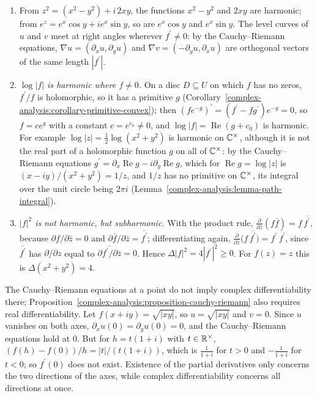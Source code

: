 \begin{example}\label{complex-analysis:example-harmonic}
\begin{enumerate}
\item From $z^2 = (x^2 - y^2) + i\,2xy$, the functions $x^2 - y^2$ and $2xy$ are harmonic; from $e^z = e^x\cos y + ie^x\sin y$, so are $e^x\cos y$ and $e^x\sin y$. The level curves of $u$ and
$v$ meet at right angles wherever $f^{\prime} \neq 0$: by the Cauchy--Riemann equations, $\nabla u = (\partial_xu, \partial_yu)$ and $\nabla v = (-\partial_yu, \partial_xu)$ are orthogonal vectors of
the same length $|f^{\prime}|$.
\item \emph{$\log|f|$ is harmonic where $f \neq 0$.} On a disc $D \subseteq U$ on which $f$ has no zeros, $f^{\prime}/f$ is holomorphic, so it has a primitive $g$
(Corollary~\ref{complex-analysis:corollary-primitive-convex}); then $(fe^{-g})^{\prime} = (f^{\prime} - fg^{\prime})e^{-g} = 0$, so $f = ce^g$ with a constant $c = e^{c_0} \neq 0$, and
$\log|f| = \operatorname{Re}(g + c_0)$ is harmonic. For example $\log|z| = \frac12\log(x^2 + y^2)$ is harmonic on $\mathbb{C}^\times$, although it is not the real part of a holomorphic function $g$ on all of
$\mathbb{C}^\times$: by the Cauchy--Riemann equations $g^{\prime} = \partial_x\operatorname{Re}g - i\partial_y\operatorname{Re}g$, which for $\operatorname{Re}g = \log|z|$ is $(x - iy)/(x^2 + y^2) = 1/z$, and
$1/z$ has no primitive on $\mathbb{C}^\times$, its integral over the unit circle being $2\pi i$ (Lemma~\ref{complex-analysis:lemma-path-integral}).
\item \emph{$|f|^2$ is not harmonic, but subharmonic.} With the product rule, $\frac{\partial}{\partial\bar z}(f\bar f) = f\,\overline{f^{\prime}}$, because $\partial f/\partial\bar z = 0$ and
$\partial\bar f/\partial\bar z = \overline{f^{\prime}}$; differentiating again, $\frac{\partial}{\partial z}\bigl(f\,\overline{f^{\prime}}\bigr) = f^{\prime}\,\overline{f^{\prime}}$, since $\overline{f^{\prime}}$
has $\partial/\partial z$ equal to $\overline{\partial f^{\prime}/\partial\bar z} = 0$. Hence $\Delta|f|^2 = 4|f^{\prime}|^2 \geq 0$. For $f(z) = z$ this is $\Delta(x^2 + y^2) = 4$.
\end{enumerate}
\end{example}

\begin{counterexample}\label{complex-analysis:counterexample-cauchy-riemann-point}
The Cauchy--Riemann equations at a point do not imply complex differentiability there; Proposition~\ref{complex-analysis:proposition-cauchy-riemann} also requires real differentiability. Let
$f(x + iy) = \sqrt{|xy|}$, so $u = \sqrt{|xy|}$ and $v = 0$. Since $u$ vanishes on both axes, $\partial_xu(0) = \partial_yu(0) = 0$, and the Cauchy--Riemann equations hold at $0$. But for $h = t(1 + i)$
with $t \in \mathbb{R}^\times$, $(f(h) - f(0))/h = |t|/(t(1 + i))$, which is $\frac1{1 + i}$ for $t > 0$ and $-\frac1{1 + i}$ for $t < 0$; so $f^{\prime}(0)$ does not exist. Existence of the partial derivatives
only concerns the two directions of the axes, while complex differentiability concerns all directions at once.
\end{counterexample}

